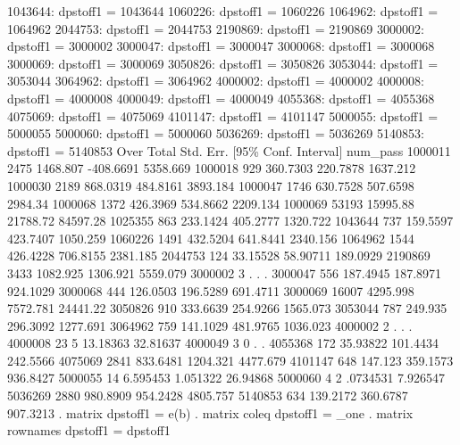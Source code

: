       1043644: dpstoff1 = 1043644
      1060226: dpstoff1 = 1060226
      1064962: dpstoff1 = 1064962
      2044753: dpstoff1 = 2044753
      2190869: dpstoff1 = 2190869
      3000002: dpstoff1 = 3000002
      3000047: dpstoff1 = 3000047
      3000068: dpstoff1 = 3000068
      3000069: dpstoff1 = 3000069
      3050826: dpstoff1 = 3050826
      3053044: dpstoff1 = 3053044
      3064962: dpstoff1 = 3064962
      4000002: dpstoff1 = 4000002
      4000008: dpstoff1 = 4000008
      4000049: dpstoff1 = 4000049
      4055368: dpstoff1 = 4055368
      4075069: dpstoff1 = 4075069
      4101147: dpstoff1 = 4101147
      5000055: dpstoff1 = 5000055
      5000060: dpstoff1 = 5000060
      5036269: dpstoff1 = 5036269
      5140853: dpstoff1 = 5140853
{\smallskip}
        Over {\VBAR}      Total   Std. Err.     [95\% Conf. Interval]
num_pass     {\VBAR}
     1000011 {\VBAR}       2475   1468.807     -408.6691    5358.669
     1000018 {\VBAR}        929   360.7303      220.7878    1637.212
     1000030 {\VBAR}       2189   868.0319      484.8161    3893.184
     1000047 {\VBAR}       1746   630.7528      507.6598     2984.34
     1000068 {\VBAR}       1372   426.3969      534.8662    2209.134
     1000069 {\VBAR}      53193   15995.88      21788.72    84597.28
     1025355 {\VBAR}        863   233.1424      405.2777    1320.722
     1043644 {\VBAR}        737   159.5597      423.7407    1050.259
     1060226 {\VBAR}       1491   432.5204      641.8441    2340.156
     1064962 {\VBAR}       1544   426.4228      706.8155    2381.185
     2044753 {\VBAR}        124   33.15528      58.90711    189.0929
     2190869 {\VBAR}       3433   1082.925      1306.921    5559.079
     3000002 {\VBAR}          3          .             .           .
     3000047 {\VBAR}        556   187.4945      187.8971    924.1029
     3000068 {\VBAR}        444   126.0503      196.5289    691.4711
     3000069 {\VBAR}      16007   4295.998      7572.781    24441.22
     3050826 {\VBAR}        910   333.6639      254.9266    1565.073
     3053044 {\VBAR}        787    249.935      296.3092    1277.691
     3064962 {\VBAR}        759   141.1029      481.9765    1036.023
     4000002 {\VBAR}          2          .             .           .
     4000008 {\VBAR}         23          5      13.18363    32.81637
     4000049 {\VBAR}          3          0             .           .
     4055368 {\VBAR}        172   35.93822      101.4434    242.5566
     4075069 {\VBAR}       2841   833.6481      1204.321    4477.679
     4101147 {\VBAR}        648    147.123      359.1573    936.8427
     5000055 {\VBAR}         14   6.595453      1.051322    26.94868
     5000060 {\VBAR}          4          2      .0734531    7.926547
     5036269 {\VBAR}       2880   980.8909      954.2428    4805.757
     5140853 {\VBAR}        634   139.2172      360.6787    907.3213
{\smallskip}
. matrix dpstoff1 = e(b)
{\smallskip}
. matrix coleq dpstoff1 = _one
{\smallskip}
. matrix rownames dpstoff1 = dpstoff1
{\smallskip}
